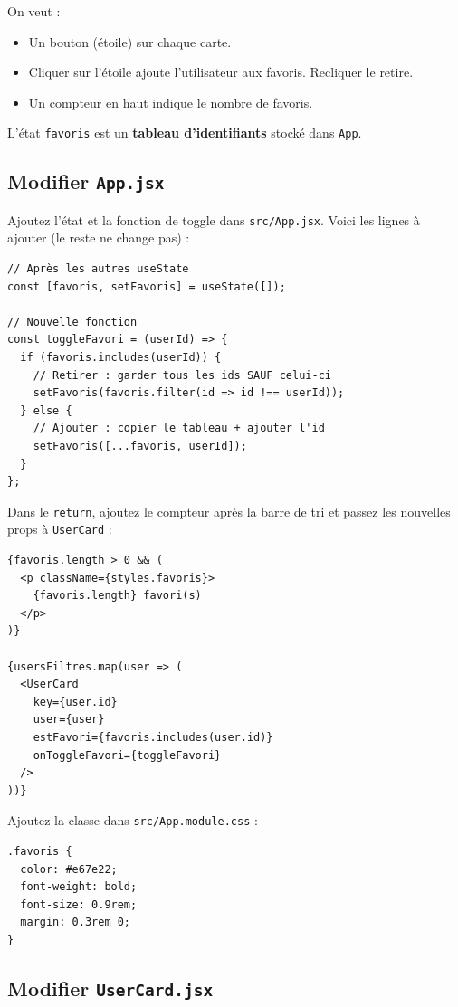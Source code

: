 \documentclass[11pt,a4paper]{article}
\begin{document}
On veut :
\begin{itemize}[nosep]
    \item Un bouton  (étoile) sur chaque carte.
    \item Cliquer sur l'étoile ajoute l'utilisateur aux favoris. Recliquer le retire.
    \item Un compteur en haut indique le nombre de favoris.
\end{itemize}

L'état \texttt{favoris} est un \textbf{tableau d'identifiants} stocké dans \texttt{App}.

\subsection{Modifier \texttt{App.jsx}}

Ajoutez l'état et la fonction de toggle dans \texttt{src/App.jsx}. Voici les lignes à ajouter (le reste ne change pas) :

\begin{lstlisting}
// Après les autres useState
const [favoris, setFavoris] = useState([]);

// Nouvelle fonction
const toggleFavori = (userId) => {
  if (favoris.includes(userId)) {
    // Retirer : garder tous les ids SAUF celui-ci
    setFavoris(favoris.filter(id => id !== userId));
  } else {
    // Ajouter : copier le tableau + ajouter l'id
    setFavoris([...favoris, userId]);
  }
};
\end{lstlisting}

Dans le \texttt{return}, ajoutez le compteur après la barre de tri et passez les nouvelles props à \texttt{UserCard} :

\begin{lstlisting}
{favoris.length > 0 && (
  <p className={styles.favoris}>
    {favoris.length} favori(s)
  </p>
)}

{usersFiltres.map(user => (
  <UserCard
    key={user.id}
    user={user}
    estFavori={favoris.includes(user.id)}
    onToggleFavori={toggleFavori}
  />
))}
\end{lstlisting}

Ajoutez la classe dans \texttt{src/App.module.css} :

\begin{lstlisting}[style=css]
.favoris {
  color: #e67e22;
  font-weight: bold;
  font-size: 0.9rem;
  margin: 0.3rem 0;
}
\end{lstlisting}

\subsection{Modifier \texttt{UserCard.jsx}}
\end{document}

